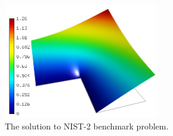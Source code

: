 \documentclass[12pt]{elsarticle}
\begin{document}
\begin{figure}[H]
\centering
\vspace{-3mm}
\includegraphics[height=5cm]{nist/nist-2/solution.png}
\vspace{-3mm}
\caption{The solution to NIST-2 benchmark problem.}
\label{fig:sln-nist02}
\end{figure}

\end{document}
